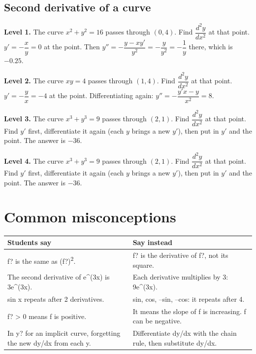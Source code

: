 \documentclass[11pt]{article}
\begin{document}
\subsection*{Second derivative of a curve}
\noindent\textbf{Level 1.} The curve $x^2+y^2=16$ passes through $(0,4)$. Find $\dfrac{d^2y}{dx^2}$ at that point.\\  \quad $y'=-\dfrac xy=0$ at the point. Then $y''=-\dfrac{y-xy'}{y^2}=-\dfrac{y}{y^2}=-\dfrac1y$ there, which is $-0.25$.\par\medskip
\noindent\textbf{Level 2.} The curve $xy=4$ passes through $(1,4)$. Find $\dfrac{d^2y}{dx^2}$ at that point.\\  \quad $y'=-\dfrac yx=-4$ at the point. Differentiating again: $y''=-\dfrac{y'x-y}{x^2}=8$.\par\medskip
\noindent\textbf{Level 3.} The curve $x^3+y^3=9$ passes through $(2,1)$. Find $\dfrac{d^2y}{dx^2}$ at that point.\\  \quad Find $y'$ first, differentiate it again (each $y$ brings a new $y'$), then put in $y'$ and the point. The answer is $-36$.\par\medskip
\noindent\textbf{Level 4.} The curve $x^3+y^3=9$ passes through $(2,1)$. Find $\dfrac{d^2y}{dx^2}$ at that point.\\  \quad Find $y'$ first, differentiate it again (each $y$ brings a new $y'$), then put in $y'$ and the point. The answer is $-36$.\par\medskip
\section*{Common misconceptions}\begin{tabularx}{\textwidth}{@{}X X@{}}\toprule Students say & Say instead\\\midrule
f? is the same as (f?)\textsuperscript{2}. & f? is the derivative of f?, not its square.\\
The second derivative of e\textasciicircum{}(3x) is 3e\textasciicircum{}(3x). & Each derivative multiplies by 3: 9e\textasciicircum{}(3x).\\
sin x repeats after 2 derivatives. & sin, cos, --sin, --cos: it repeats after 4.\\
f? > 0 means f is positive. & It means the slope of f is increasing. f can be negative.\\
In y? for an implicit curve, forgetting the new dy/dx from each y. & Differentiate dy/dx with the chain rule, then substitute dy/dx.\\
\bottomrule\end{tabularx}
\end{document}
